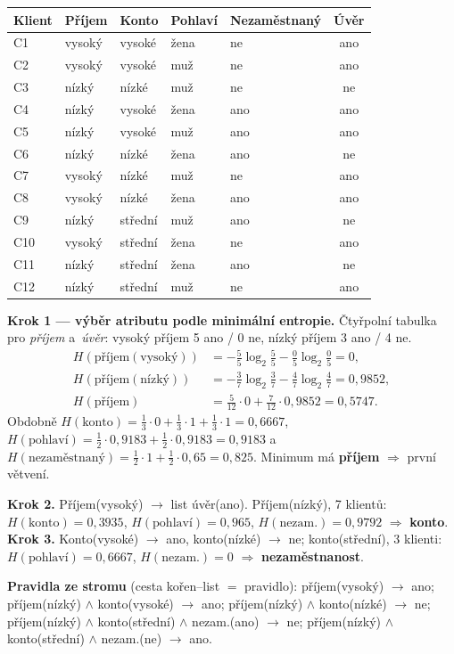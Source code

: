 \documentclass[11pt,a4paper]{article}
\theoremstyle{definition}
\begin{document}
\begin{defbox}
\begin{center}
\small
\begin{tabular}{@{}lllllc@{}}
\toprule
Klient & Příjem & Konto & Pohlaví & Nezaměstnaný & Úvěr \\
\midrule
C1 & vysoký & vysoké & žena & ne & ano \\
C2 & vysoký & vysoké & muž & ne & ano \\
C3 & nízký & nízké & muž & ne & ne \\
C4 & nízký & vysoké & žena & ano & ano \\
C5 & nízký & vysoké & muž & ano & ano \\
C6 & nízký & nízké & žena & ano & ne \\
C7 & vysoký & nízké & muž & ne & ano \\
C8 & vysoký & nízké & žena & ano & ano \\
C9 & nízký & střední & muž & ano & ne \\
C10 & vysoký & střední & žena & ne & ano \\
C11 & nízký & střední & žena & ano & ne \\
C12 & nízký & střední & muž & ne & ano \\
\bottomrule
\end{tabular}
\end{center}

\textbf{Krok 1 --- výběr atributu podle minimální entropie.} Čtyřpolní tabulka pro
\emph{příjem} a~\emph{úvěr}: vysoký příjem 5 ano / 0 ne, nízký příjem 3 ano / 4 ne.
\begin{align*}
H(\text{příjem}(\text{vysoký}))&=-\tfrac55\log_2\tfrac55-\tfrac05\log_2\tfrac05=0,\\
H(\text{příjem}(\text{nízký}))&=-\tfrac37\log_2\tfrac37-\tfrac47\log_2\tfrac47=0{,}9852,\\
H(\text{příjem})&=\tfrac{5}{12}\cdot 0+\tfrac{7}{12}\cdot 0{,}9852=0{,}5747.
\end{align*}
Obdobně $H(\text{konto})=\tfrac13\cdot 0+\tfrac13\cdot 1+\tfrac13\cdot 1=0{,}6667$,
$H(\text{pohlaví})=\tfrac12\cdot 0{,}9183+\tfrac12\cdot 0{,}9183=0{,}9183$
a~$H(\text{nezaměstnaný})=\tfrac12\cdot 1+\tfrac12\cdot 0{,}65=0{,}825$.
Minimum má \textbf{příjem} $\Rightarrow$ první větvení.

\textbf{Krok 2.} Příjem(vysoký) $\to$ list úvěr(ano). Příjem(nízký), 7 klientů:
$H(\text{konto})=0{,}3935$, $H(\text{pohlaví})=0{,}965$, $H(\text{nezam.})=0{,}9792$
$\Rightarrow$ \textbf{konto}. \textbf{Krok 3.} Konto(vysoké) $\to$ ano, konto(nízké) $\to$ ne;
konto(střední), 3 klienti: $H(\text{pohlaví})=0{,}6667$, $H(\text{nezam.})=0$ $\Rightarrow$
\textbf{nezaměstnanost}.

\textbf{Pravidla ze stromu} (cesta kořen--list $=$ pravidlo): příjem(vysoký) $\to$ ano;
příjem(nízký) $\wedge$ konto(vysoké) $\to$ ano; příjem(nízký) $\wedge$ konto(nízké) $\to$ ne;
příjem(nízký) $\wedge$ konto(střední) $\wedge$ nezam.(ano) $\to$ ne; příjem(nízký) $\wedge$
konto(střední) $\wedge$ nezam.(ne) $\to$ ano.
\end{defbox}
\end{document}
